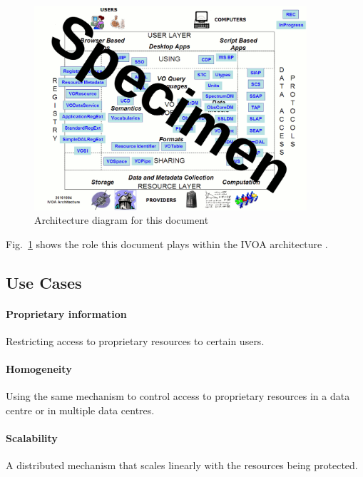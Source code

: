 \documentclass[11pt,a4paper]{ivoa}
\begin{document}
\begin{figure}
\centering


\includegraphics[width=0.9\textwidth]{archdiag.png}
\caption{Architecture diagram for this document}
\label{fig:archdiag}
\end{figure}

Fig.~\ref{fig:archdiag} shows the role this document plays within the
IVOA architecture \citep{note:VOARCH}.

\subsection{Use Cases}

\paragraph{Proprietary information} Restricting access to proprietary resources to certain users.

\paragraph{Homogeneity} Using the same mechanism to control access to proprietary resources in a data centre or in multiple data centres.

\paragraph{Scalability} A distributed mechanism that scales linearly with the resources being protected.
\end{document}
